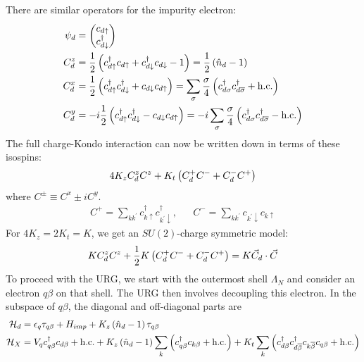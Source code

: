 \documentclass[12pt,twoside]{report}
\numberwithin{equation}{section}
\begin{document}
There are similar operators for the impurity electron:
\begin{equation}\begin{aligned}
\psi_d &= \begin{pmatrix} c_{d\uparrow} \\ c^\dagger_{d\downarrow} \end{pmatrix}\\
C^z_d &= \frac{1}{2}\left( c^\dagger_{d\uparrow}c_{d \uparrow} + c^\dagger_{d\downarrow}c_{d \downarrow} - 1  \right) = \frac{1}{2}\left( \hat n_d - 1 \right) \\
C^x_d &= \frac{1}{2}\left(c^\dagger_{d\uparrow}c^\dagger_{d \downarrow} + c_{d\downarrow}c_{d \uparrow} \right) = \sum_\sigma \frac{\sigma}{4}\left( c^\dagger_{d\sigma}c^\dagger_{d\overline\sigma} + \text{h.c.} \right) \\
C^y_d &= -i \frac{1}{2}\left(c^\dagger_{d\uparrow}c^\dagger_{d \downarrow} - c_{d\downarrow}c_{d \uparrow} \right) = -i\sum_\sigma \frac{\sigma}{4}\left( c^\dagger_{d\sigma}c^\dagger_{d\overline\sigma} - \text{h.c.} \right)\\
\end{aligned}\end{equation}
The full charge-Kondo interaction can now be written down in terms of these isospins:
\begin{equation}\begin{aligned}
4K_z C_d^z C^z + K_t \left({C_d^+ C^-+ C_d^- C^+}\right)
\end{aligned}\end{equation}
where \(C^\pm \equiv C^x \pm iC^y\).
\begin{equation}\begin{aligned}
	C^+ = \sum_{kk^\prime} c^\dagger_{k\uparrow}c^\dagger_{k^\prime\downarrow}, && C^- = \sum_{kk^\prime}c_{k^\prime\downarrow}c_{k\uparrow}
\end{aligned}\end{equation}
For \(4K_z = 2K_t=K\), we get an \(SU(2)\)-charge symmetric model:
\begin{equation}\begin{aligned}
K C_d^z C^z + \frac{1}{2} K \left({C_d^+ C^-+ C_d^- C^+}\right) = K \vec C_d \cdot \vec C
\end{aligned}\end{equation}
To proceed with the URG, we start with the outermost shell \(\Lambda_N\) and consider an electron \(q\beta\) on that shell.
The URG then involves decoupling this electron.
In the subspace of \(q\beta\), the diagonal and off-diagonal parts are
\begin{equation}\begin{aligned}
	\mathcal{H}_d &= \epsilon_q \tau_{q\beta} + H_{imp} + K_z \left({\hat n_d -1}\right)\tau_{q\beta}\\
	\mathcal{H}_X &= V_qc^\dagger_{q\beta}c_{d\beta} + \text{h.c.} + K_z \left({\hat n_d -1}\right)\sum_k \left({c^\dagger_{q\beta}c_{k\beta} + \text{h.c.}}\right) + K_t \sum_k \left({c^\dagger_{d\beta}c^\dagger_{d\overline\beta}c_{k\overline\beta}c_{q\beta} + \text{h.c.}}\right) \\
\end{aligned}\end{equation}
\end{document}
